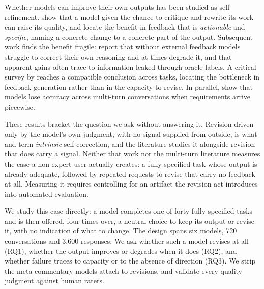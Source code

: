 Whether models can improve their own outputs has been studied as self-refinement.
\citet{madaan2024self} show that a model given the chance to critique and rewrite its work
can raise its quality, and locate the benefit in feedback that is \emph{actionable} and
\emph{specific}, naming a concrete change to a concrete part of the output. Subsequent work finds the benefit fragile: \citet{huang2024large} report that without external feedback
models struggle to correct their own reasoning and at times degrade it, and that apparent
gains often trace to information leaked through oracle labels. A critical survey by
\citet{kamoi2024selfcorrection} reaches a compatible conclusion across tasks, locating the
bottleneck in feedback generation rather than in the capacity to revise. In parallel,
\citet{laban2025lost} show that models lose accuracy across multi-turn conversations when
requirements arrive piecewise.

These results bracket the question we ask without answering it. Revision driven only by the
model's own judgment, with no signal supplied from outside, is what
\citet{kamoi2024selfcorrection} and \citet{huang2024large} term \emph{intrinsic}
self-correction, and the literature studies it alongside revision that does carry a signal.
Neither that work nor the multi-turn literature measures the case a non-expert user
actually creates: a fully specified task whose output is already adequate, followed by
repeated requests to revise that carry no feedback at all. Measuring it requires
controlling for an artifact the revision act introduces into automated evaluation.

We study this case directly: a model completes one of forty fully specified tasks and is
then offered, four times over, a neutral choice to keep its output or revise it, with no indication of what to change. The design spans six models, 720
conversations and 3,600 responses. We ask whether such a model revises at all (RQ1),
whether the output improves or degrades when it does (RQ2), and whether failure traces to
capacity or to the absence of direction (RQ3).
We strip the meta-commentary models attach to revisions, and validate every quality
judgment against human raters.

